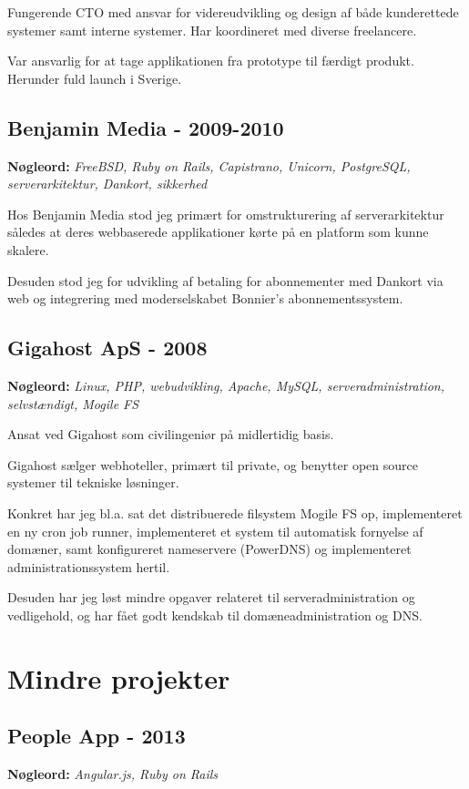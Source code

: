 \documentclass[a4paper]{article}
\newcommand{\keywords}[1]{\small\textbf{Nøgleord:} \emph{#1}\normalsize}
\begin{document}
Fungerende CTO med ansvar for videreudvikling og design af både kunderettede systemer samt interne systemer. Har koordineret med diverse freelancere.

Var ansvarlig for at tage applikationen fra prototype til færdigt produkt. Herunder fuld launch i Sverige. 

\subsection*{Benjamin Media - 2009-2010}

\keywords{FreeBSD, Ruby on Rails, Capistrano, Unicorn, PostgreSQL, serverarkitektur, Dankort, sikkerhed}

Hos Benjamin Media stod jeg primært for omstrukturering af serverarkitektur således at deres webbaserede applikationer kørte på en platform som kunne skalere.

Desuden stod jeg for udvikling af betaling for abonnementer med Dankort via web og integrering med moderselskabet Bonnier's abonnementssystem.

\subsection*{Gigahost ApS - 2008}

\keywords{Linux, PHP, webudvikling, Apache, MySQL, serveradministration, selvstændigt, Mogile FS}

Ansat ved Gigahost som civilingeniør på midlertidig basis.

Gigahost sælger webhoteller, primært til private, og benytter open source systemer til tekniske løsninger.

Konkret har jeg bl.a. sat det distribuerede filsystem Mogile FS op, implementeret en ny cron job runner, implementeret et system til automatisk fornyelse af domæner, samt konfigureret nameservere (PowerDNS) og implementeret administrationssystem hertil.

Desuden har jeg løst mindre opgaver relateret til serveradministration og vedligehold, og har fået godt kendskab til domæneadministration og DNS.


\section*{Mindre projekter}

\subsection*{People App - 2013}
\keywords{Angular.js, Ruby on Rails}
\end{document}
